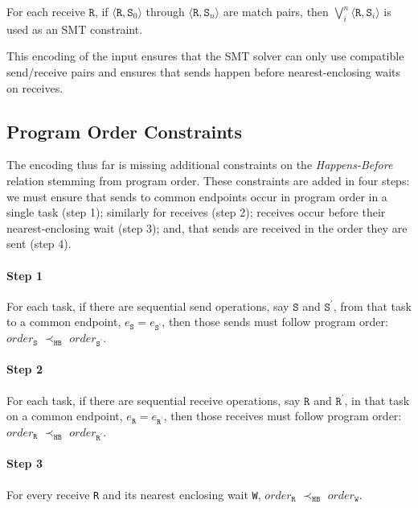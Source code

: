 \begin{definition}
For each receive $\mathtt{R}$, if $\langle\mathtt{R},
\mathtt{S}_0\rangle$ through $\langle\mathtt{R}, \mathtt{S}_n\rangle$
are match pairs, then $\bigvee_{i}^{n} \langle\mathtt{R},
\mathtt{S}_i\rangle$ is used as an SMT constraint.
\end{definition}

This encoding of the input ensures that the SMT solver can only use
compatible send/receive pairs and ensures that sends happen before
nearest-enclosing waits on receives.

\subsection{Program Order Constraints}

The encoding thus far is missing
additional constraints on the \emph{Happens-Before} relation stemming from program order. These constraints are added in four steps: we must ensure that sends to common endpoints occur
in program order in a single task (step 1); similarly for receives
(step 2); receives occur before their nearest-enclosing wait (step 3);
and, that sends are received in the order they are sent (step 4).

\paragraph*{Step 1} For each task, if there are sequential send
operations, say $\mathtt{S}$ and $\mathtt{S^\prime}$, from that task
to a common endpoint, $e_\mathtt{S} = e_\mathtt{S^\prime}$, then those
sends must follow program order: $\mathit{order}_\mathtt{S}$
$\prec_\mathtt{HB}$ $\mathit{order}_\mathtt{S^\prime}$.

\paragraph*{Step 2} For each task, if there are sequential receive
operations, say $\mathtt{R}$ and $\mathtt{R^\prime}$, in that task
on a common endpoint, $e_\mathtt{R} = e_\mathtt{R^\prime}$, then those
receives must follow program order: $\mathit{order}_\mathtt{R}$
$\prec_\mathtt{HB}$ $\mathit{order}_\mathtt{R^\prime}$.

\paragraph*{Step 3} For every receive \texttt{R} and its nearest
enclosing wait \texttt{W}, $\mathit{order}_\mathtt{R}$
$\prec_\mathtt{HB}$ $\mathit{order}_\mathtt{W}$.


